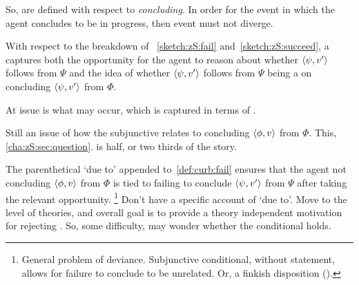 \begin{note}[\curb{3}]
  So,  are defined with respect to \emph{concluding}.
  In order for the event in which the agent concludes to be in progress, then event must not diverge.

  With respect to the breakdown of ~\ref{sketch:zS:fail} and~\ref{sketch:zS:succeed}, a \curb{} captures both the opportunity for the agent to reason about whether \(\langle \psi, v' \rangle\) follows from \(\Psi\) and the idea of whether \(\langle \psi, v' \rangle\) follows from \(\Psi\) being a  on concluding \(\langle \psi, v' \rangle\) from \(\Phi\).

  At issue is what may occur, which is captured in terms of .
\end{note}

\begin{note}
  Still an issue of how the subjunctive relates to concluding \(\langle \phi, v \rangle\) from \(\Phi\).
  This, \autoref{cha:zS:sec:question}.
  \curb{} is half, or two thirds of the story.
\end{note}

\begin{note}
  The parenthetical `due to' appended to~\ref{def:curb:fail} ensures that the agent not concluding \(\langle \phi, v \rangle\) from \(\Phi\) is tied to failing to conclude \(\langle \psi, v' \rangle\) from \(\Psi\) after taking the relevant opportunity.%
  \footnote{
    General problem of deviance.
    Subjunctive conditional, without statement, allows for failure to conclude to be unrelated.
    Or, a finkish disposition (\cite[cf.][144]{Lewis:1997wg}).
  }
  Don't have a specific account of `due to'.
  Move to the level of theories, and overall goal is to provide a theory independent motivation for rejecting \issueConstraint{}.
  So, some difficulty, may wonder whether the conditional holds.
\end{note}

